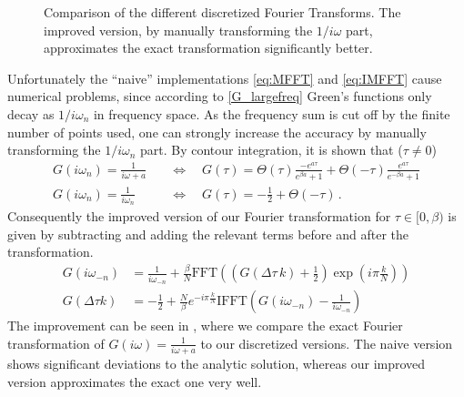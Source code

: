 \begin{appendix}
\begin{figure}[h]
	\caption{Comparison of the different discretized Fourier Transforms. The improved version, by manually transforming the $1/i \omega$ part, approximates the exact transformation significantly better. }
	\label{fig:fourier_traf}
\end{figure}

Unfortunately the ``naive'' implementations \eqref{eq:MFFT} and \eqref{eq:IMFFT} cause numerical problems, since according to \eqref{G_largefreq} Green's functions only decay as $1/ i\omega_n$ in frequency space. As the frequency sum is cut off by the finite number of points used, one can strongly increase the accuracy by manually transforming the $1/ i\omega_n$ part. By contour integration, it is shown that ($\tau \neq 0$)
%
\begin{align}
G(i\omega_n) = \frac{1}{i\omega + a}
\quad &\Leftrightarrow \quad
G(\tau) = \Theta(\tau) \frac{- e^{a \tau}}{e^{\beta a}+1} + \Theta(-\tau) \frac{e^{a \tau}}{e^{-\beta a}+1} 
\\
	G(i ω_n) =\frac{1}{i ω_n} \quad &⇔ \quad G(τ)=-\frac{1}{2} + \Theta(-\tau)
	\label{eq:ff_pair}
\, .
\end{align}
Consequently the improved version of our Fourier transformation for $τ∈[0,β)$ is given by subtracting and adding the relevant terms before and after the transformation.
\begin{align}
	G(i ω_{-n})&= \frac{1}{i ω_{-n}}+\frac{\beta}{N} \mathrm{FFT}\left( \left(G(\Delta τ \, k)+\frac{1}{2}\right)\exp{\left(i π \frac{k}{N}\right)}\right)\\
	G(\Delta τ k)&= -\frac{1}{2}+\frac{N}{β} e^{-i π \frac{k}{N}}\mathrm{IFFT}\left(G(iω_{-n})-\frac{1}{i ω_{-n}}\right)
	\label{eq:improved_fft}
\end{align}
The improvement can be seen in , where we compare the exact Fourier transformation of $G(i ω)=\frac{1}{iω+a}$ to our discretized versions. The naive version shows significant deviations to the analytic solution, whereas our improved version approximates the exact one very well.  



\end{appendix}
